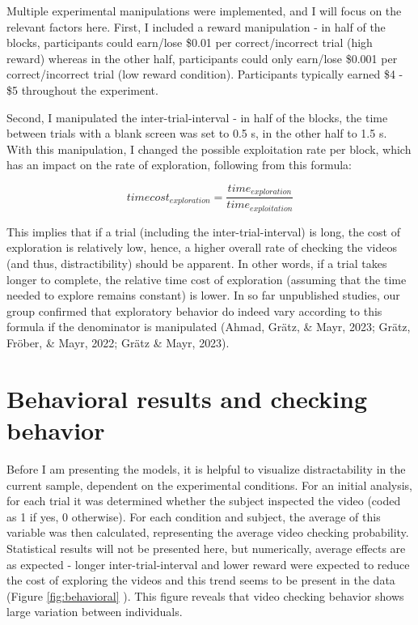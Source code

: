 \documentclass[
  man,floatsintext]{apa6}
\begin{document}
Multiple experimental manipulations were implemented, and I will focus on the relevant factors here. First, I included a reward manipulation - in half of the blocks, participants could earn/lose \$0.01 per correct/incorrect trial (high reward) whereas in the other half, participants could only earn/lose \$0.001 per correct/incorrect trial (low reward condition). Participants typically earned \$4 - \$5 throughout the experiment.

Second, I manipulated the inter-trial-interval - in half of the blocks, the time between trials with a blank screen was set to 0.5 s, in the other half to 1.5 s. With this manipulation, I changed the possible exploitation rate per block, which has an impact on the rate of exploration, following from this formula:

\[time cost_{exploration} = \frac{time_{exploration}}{time_{exploitation}}\]

This implies that if a trial (including the inter-trial-interval) is long, the cost of exploration is relatively low, hence, a higher overall rate of checking the videos (and thus, distractibility) should be apparent. In other words, if a trial takes longer to complete, the relative time cost of exploration (assuming that the time needed to explore remains constant) is lower. In so far unpublished studies, our group confirmed that exploratory behavior do indeed vary according to this formula if the denominator is manipulated (Ahmad, Grätz, \& Mayr, 2023; Grätz, Fröber, \& Mayr, 2022; Grätz \& Mayr, 2023).

\hypertarget{behavioral-results-and-checking-behavior}{%
\section{Behavioral results and checking behavior}\label{behavioral-results-and-checking-behavior}}

Before I am presenting the models, it is helpful to visualize distractability in the current sample, dependent on the experimental conditions. For an initial analysis, for each trial it was determined whether the subject inspected the video (coded as 1 if yes, 0 otherwise). For each condition and subject, the average of this variable was then calculated, representing the average video checking probability. Statistical results will not be presented here, but numerically, average effects are as expected - longer inter-trial-interval and lower reward were expected to reduce the cost of exploring the videos and this trend seems to be present in the data (Figure \ref{fig:behavioral} ). This figure reveals that video checking behavior shows large variation between individuals.
\end{document}
